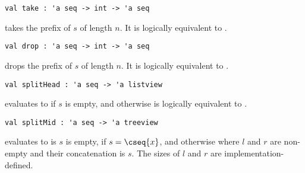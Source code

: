 \begin{cluster}
\label{grp:gr:take}

\begin{gram}[take]
\label{gr:take}
\begin{verbatim}
val take : 'a seq -> int -> 'a seq
\end{verbatim}
 takes the prefix of $s$ of length $n$. It is logically
equivalent to .

\end{gram}
\end{cluster}

\begin{cluster}
\label{grp:gr:drop}

\begin{gram}[drop]
\label{gr:drop}
\begin{verbatim}
val drop : 'a seq -> int -> 'a seq
\end{verbatim}
 drops the prefix of $s$ of length $n$. It is logically equivalent
to .

\end{gram}
\end{cluster}

\begin{cluster}
\label{grp:gr:splitHead}

\begin{gram}[splitHead]
\label{gr:splitHead}
\begin{verbatim}
val splitHead : 'a seq -> 'a listview
\end{verbatim}
 evaluates to  if $s$ is empty, and otherwise is
logically equivalent to .

\end{gram}
\end{cluster}

\begin{cluster}
\label{grp:gr:splitMid}

\begin{gram}[splitMid]
\label{gr:splitMid}
\begin{verbatim}
val splitMid : 'a seq -> 'a treeview
\end{verbatim}
 evaluates to  is $s$ is empty,  if
$s = \cseq{x}$, and  otherwise where $l$ and $r$ are non-empty and their
concatenation is $s$. The sizes of $l$ and $r$ are implementation-defined.

\end{gram}
\end{cluster}

